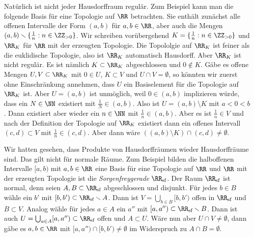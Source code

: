 Natürlich ist nicht jeder Hausdorffraum regulär. Zum Beispiel kann man die folgende Basis für eine Topologie auf $\RR$ betrachten. Sie enthält zunächst alle offenen Intervalle der Form $(a,b)$ für $a,b\in\RR$, aber auch die Mengen $(a,b)\setminus\{\tfrac1n : n\in\ZZ_{>0}\}$. Wir schreiben vorübergehend $K = \{\tfrac1n : n\in\ZZ_{>0}\}$ und $\RR_K$ für $\RR$ mit der erzeugten Topologie. Die Topololgie auf $\RR_K$ ist feiner als die euklidische Topologie, also ist $\RR_K$ automatisch Hausdorff. Aber $\RR_K$ ist nicht regulär. Es ist nämlich $K\subset \RR_K$ abgeschlossen und $0\not\in K$. Gäbe es offene Mengen $U,V\subset\RR_K$ mit $0\in U$, $K\subset V$ und $U\cap V = \emptyset$, so könnten wir zuerst ohne Einschränkung annehmen, dass $U$ ein Basiselement für die Topologie auf $\RR_K$ ist. Aber $U=(a,b)$ ist unmöglich, weil $0\in(a,b)$ implizieren würde, dass ein $N\in\NN$ existiert mit $\tfrac1N\in (a,b)$. Also ist $U = (a,b)\setminus K$ mit $a<0<b$. Dann existiert aber wieder ein $n\in\NN$ mit $\tfrac1n\in(a,b)$. Aber es ist $\frac1n\in V$ und nach der Definition der Topologie auf $\RR_K$ existiert dann ein offenes Intervall $(c,d)\subset V$ mit $\tfrac1n\in(c,d)$. Aber dann wäre $((a,b)\setminus K)\cap (c,d)\neq\emptyset$.

Wir hatten gesehen, dass Produkte von Hausdorffräumen wieder Hausdorffräume sind. Das gilt nicht für normale Räume. Zum Beispiel bilden die halboffenen Intervalle $[a,b)$ mit $a,b\in\RR$ eine Basis für eine Topologie auf $\RR$ und $\RR$ mit der erzeugten Topologie ist die \emph{Sorgenfreygerade} $\Rsf$. Der Raum $\Rsf$ ist normal, denn seien $A,B\subset\Rsf$ abgeschlossen und disjunkt. Für jedes $b\in B$ wähle ein $b'$ mit $[b,b')\subset \Rsf\setminus A$. Dann ist $V = \bigcup_{b\in B}[b,b')$ offen in $\Rsf$ und $B\subset V$. Analog wähle für jedes $a\in A$ ein $a''$ mit $[a,a'')\subset \Rsf\setminus B$. Dann ist auch $U = \bigcup_{a\in A} [a,a'')\subset\Rsf$ offen und $A\subset U$. Wäre nun aber $U\cap V\neq\emptyset$, dann gäbe es $a,b\in\RR$ mit $[a,a'')\cap [b,b')\neq\emptyset$ im Widerspruch zu $A\cap B = \emptyset$.

